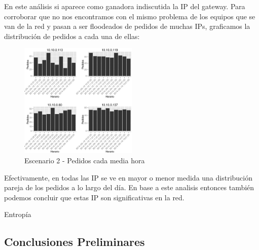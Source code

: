     \par En este análisis si aparece como ganadora indiscutida la IP del gateway. Para corroborar que no nos encontramos con el mismo problema de los equipos que se van de la red y pasan a ser floodeados de pedidos de muchas IPs, graficamos la distribución de pedidos a cada una de ellas:
    \begin{figure}[H]
		\centering
		\includegraphics[width=0.5\textwidth]{img/graph/escenario_2/distribucionHoraria4IPsMasPedidas.eps}
		\caption{Escenario 2 - Pedidos cada media hora}
		\label{fig:escenario2_distribucionHoraria4IPsMasPedidas}
	\end{figure}
    \par Efectivamente, en todas las IP se ve en mayor o menor medida una distribución pareja de los pedidos a lo largo del día. En base a este analisis entonces también podemos concluir que estas IP son significativas en la red.
        
	\par Entrop\'ia

\subsection{Conclusiones Preliminares}